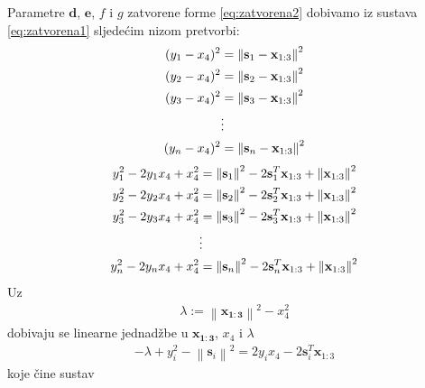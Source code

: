 \documentclass[a4paper,twoside,12pt]{memoir} %
\begin{document}
Parametre $\mathbf{d}$, $\mathbf{e}$, $f$ i $g$ zatvorene forme \ref{eq:zatvorena2} dobivamo iz sustava \ref{eq:zatvorena1}
sljedećim nizom pretvorbi: \\

\begin{align}
(y_1 -x_4)^2 &= \left \| \mathbf{s}_1 - \mathbf{x}_{1:3} \right \|^2 \notag \\
(y_2 -x_4)^2 &= \left \| \mathbf{s}_2 - \mathbf{x}_{1:3} \right \|^2 \notag \\
(y_3 -x_4)^2 &= \left \| \mathbf{s}_3 - \mathbf{x}_{1:3} \right \|^2 \\
&\vdots \notag \\
(y_n -x_4)^2 &= \left \| \mathbf{s}_n - \mathbf{x}_{1:3} \right \|^2 \notag 
\end{align}
\begin{align}
y_1^2 -2y_1 x_4 + x_4^2 &= \left \| \mathbf{s}_1\right \|^2 -2\mathbf{s}_1^T\mathbf{x}_{1:3} +\left\|  \mathbf{x}_{1:3} \right \|^2 \notag \\
y_2^2 -2y_2 x_4 + x_4^2 &= \left \| \mathbf{s}_2\right \|^2 -2\mathbf{s}_2^T\mathbf{x}_{1:3} +\left\|  \mathbf{x}_{1:3} \right \|^2 \notag \\
y_3^2 -2y_3 x_4 + x_4^2 &= \left \| \mathbf{s}_3\right \|^2 -2\mathbf{s}_3^T\mathbf{x}_{1:3} +\left\|  \mathbf{x}_{1:3} \right \|^2 \\
&\vdots \notag \\
y_n^2 -2y_n x_4 + x_4^2 &= \left \| \mathbf{s}_n\right \|^2 -2\mathbf{s}_n^T\mathbf{x}_{1:3} +\left\|  \mathbf{x}_{1:3} \right \|^2 \notag 
\end{align}
Uz \begin{align}
	\lambda := \left\| \mathbf{x_{1:3}}\right \|^2 - x_4^2
\end{align}
dobivaju se linearne jednadžbe u $\mathbf{x_{1:3}}$, $x_4$ i $\lambda$
\begin{align}
	-\lambda+y_i^2 - \left \| \mathbf{s}_i\right \|^2 = 2y_i x_4 - 2\mathbf{s}_i^T \mathbf{x}_{1:3} 
\end{align}
koje čine sustav
\end{document}
